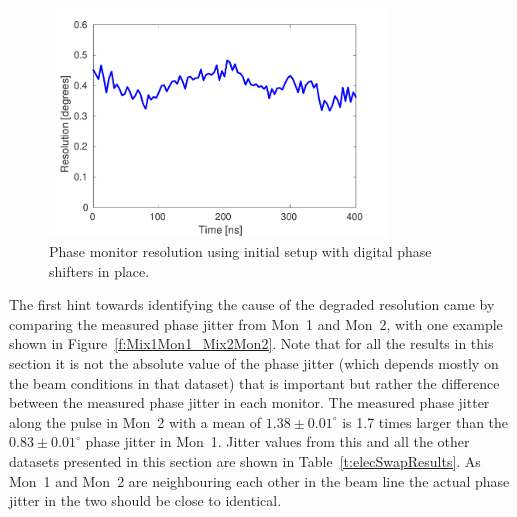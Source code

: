 \begin{figure}
  \centering
  \includegraphics[width=0.8\textwidth]{Figures/phaseMons/resolutionDigShift}
  \caption{Phase monitor resolution using initial setup with digital phase shifters in place.}
  \label{f:resolutionDigShift}
\end{figure}

The first hint towards identifying the cause of the degraded resolution came by comparing the measured phase jitter from Mon~1 and Mon~2, with one example shown in Figure~\ref{f:Mix1Mon1_Mix2Mon2}. Note that for all the results in this section it is not the absolute value of the phase jitter (which depends mostly on the beam conditions in that dataset) that is important but rather the difference between the measured phase jitter in each monitor. The measured phase jitter along the pulse in Mon~2 with a mean of \(1.38\pm0.01^\circ\) is 1.7 times larger than the \(0.83\pm0.01^\circ\) phase jitter in Mon~1. Jitter values from this and all the other datasets presented in this section are shown in Table~\ref{t:elecSwapResults}. As Mon~1 and Mon~2 are neighbouring each other in the beam line the actual phase jitter in the two should be close to identical.

